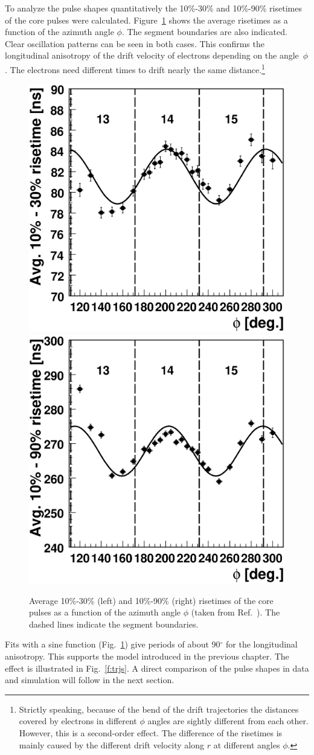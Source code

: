\documentclass[epj]{svjour}
\begin{document}
To analyze the pulse shapes quantitatively the 10\%-30\% and 10\%-90\%
risetimes of the core pulses were calculated. Figure~\ref{f:rt10}
shows the average risetimes as a function of the azimuth angle
$\phi$. The segment boundaries are also indicated.  Clear oscillation
patterns can be seen in both cases. This confirms the longitudinal
anisotropy of the drift velocity of electrons depending on the
angle~$\phi$. The electrons need different times to drift nearly the
same distance.\footnote{Strictly speaking, because of the bend of the
drift trajectories the distances covered by electrons in different
$\phi$ angles are sightly different from each other.  However, this is
a second-order effect. The difference of the risetimes is mainly
caused by the different drift velocity along $r$ at different angles
$\phi$.}
\begin{figure}\centering
\includegraphics[width=0.35\linewidth]{phi_risetime1030}
\includegraphics[width=0.35\linewidth]{phi_risetime1090}
\caption{Average 10\%-30\% (left) and 10\%-90\% (right) risetimes of
the core pulses as a function of the azimuth angle $\phi$ (taken from
Ref.~\cite{Sie07}). The dashed lines indicate the segment boundaries.}
\label{f:rt10}
\end{figure}

Fits with a sine function (Fig.~\ref{f:rt10}) give periods of
about 90$^{\circ}$ for the longitudinal anisotropy. This supports the
model introduced in the previous chapter. The effect is illustrated in
Fig.~\ref{f:trjs}. A direct comparison of the pulse shapes in
data and simulation will follow in the next section.
\end{document}
